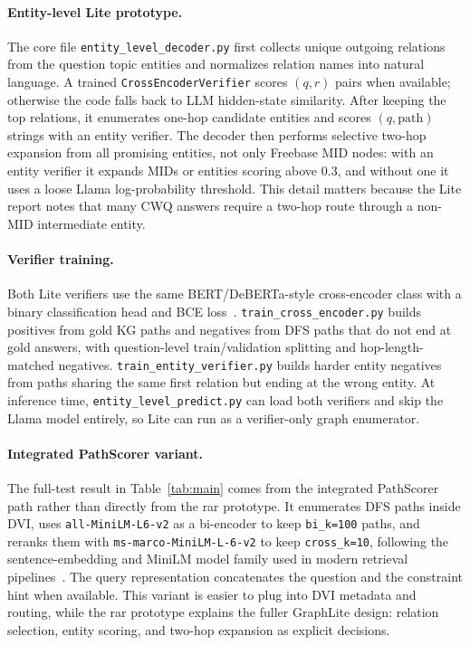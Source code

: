 \documentclass[10pt,twocolumn]{article}
\newcommand{\code}[1]{\texttt{#1}}
\begin{document}
\paragraph{Entity-level Lite prototype.}
The core file \code{entity\_level\_decoder.py} first collects unique outgoing relations from the question topic entities and normalizes relation names into natural language. A trained \code{CrossEncoderVerifier} scores $(q,r)$ pairs when available; otherwise the code falls back to LLM hidden-state similarity. After keeping the top relations, it enumerates one-hop candidate entities and scores $(q,\mathrm{path})$ strings with an entity verifier. The decoder then performs selective two-hop expansion from all promising entities, not only Freebase MID nodes: with an entity verifier it expands MIDs or entities scoring above 0.3, and without one it uses a loose Llama log-probability threshold. This detail matters because the Lite report notes that many CWQ answers require a two-hop route through a non-MID intermediate entity.

\paragraph{Verifier training.}
Both Lite verifiers use the same BERT/DeBERTa-style cross-encoder class with a binary classification head and BCE loss~\cite{devlin2019bert,he2021deberta}. \code{train\_cross\_encoder.py} builds positives from gold KG paths and negatives from DFS paths that do not end at gold answers, with question-level train/validation splitting and hop-length-matched negatives. \code{train\_entity\_verifier.py} builds harder entity negatives from paths sharing the same first relation but ending at the wrong entity. At inference time, \code{entity\_level\_predict.py} can load both verifiers and skip the Llama model entirely, so Lite can run as a verifier-only graph enumerator.

\paragraph{Integrated PathScorer variant.}
The full-test result in Table~\ref{tab:main} comes from the integrated PathScorer path rather than directly from the rar prototype. It enumerates DFS paths inside DVI, uses \code{all-MiniLM-L6-v2} as a bi-encoder to keep \code{bi\_k=100} paths, and reranks them with \code{ms-marco-MiniLM-L-6-v2} to keep \code{cross\_k=10}, following the sentence-embedding and MiniLM model family used in modern retrieval pipelines~\cite{reimers2019sentencebert,wang2020minilm}. The query representation concatenates the question and the constraint hint when available. This variant is easier to plug into DVI metadata and routing, while the rar prototype explains the fuller GraphLite design: relation selection, entity scoring, and two-hop expansion as explicit decisions.
\end{document}
